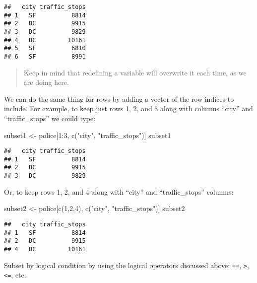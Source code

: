 \documentclass[
]{article}
\newenvironment{Shaded}{\begin{snugshade}}{\end{snugshade}}
\newcommand{\DecValTok}[1]{\textcolor[rgb]{0.00,0.00,0.81}{#1}}
\newcommand{\FunctionTok}[1]{\textcolor[rgb]{0.00,0.00,0.00}{#1}}
\newcommand{\NormalTok}[1]{#1}
\newcommand{\OtherTok}[1]{\textcolor[rgb]{0.56,0.35,0.01}{#1}}
\newcommand{\SpecialCharTok}[1]{\textcolor[rgb]{0.00,0.00,0.00}{#1}}
\newcommand{\StringTok}[1]{\textcolor[rgb]{0.31,0.60,0.02}{#1}}
\begin{document}
\begin{verbatim}
##   city traffic_stops
## 1   SF          8814
## 2   DC          9915
## 3   DC          9829
## 4   DC         10161
## 5   SF          6810
## 6   SF          8991
\end{verbatim}

\begin{quote}
Keep in mind that redefining a variable will overwrite it each time, as
we are doing here.
\end{quote}

We can do the same thing for rows by adding a vector of the row indices
to include. For example, to keep just rows 1, 2, and 3 along with
columns ``city'' and ``traffic\_stops'' we could type:

\begin{Shaded}
\begin{Highlighting}[]
\NormalTok{subset1 }\OtherTok{\textless{}{-}}\NormalTok{ police[}\DecValTok{1}\SpecialCharTok{:}\DecValTok{3}\NormalTok{, }\FunctionTok{c}\NormalTok{(}\StringTok{"city"}\NormalTok{, }\StringTok{"traffic\_stops"}\NormalTok{)]}
\NormalTok{subset1}
\end{Highlighting}
\end{Shaded}

\begin{verbatim}
##   city traffic_stops
## 1   SF          8814
## 2   DC          9915
## 3   DC          9829
\end{verbatim}

Or, to keep rows 1, 2, and 4 along with ``city'' and ``traffic\_stops''
columns:

\begin{Shaded}
\begin{Highlighting}[]
\NormalTok{subset2 }\OtherTok{\textless{}{-}}\NormalTok{ police[}\FunctionTok{c}\NormalTok{(}\DecValTok{1}\NormalTok{,}\DecValTok{2}\NormalTok{,}\DecValTok{4}\NormalTok{), }\FunctionTok{c}\NormalTok{(}\StringTok{"city"}\NormalTok{, }\StringTok{"traffic\_stops"}\NormalTok{)]}
\NormalTok{subset2}
\end{Highlighting}
\end{Shaded}

\begin{verbatim}
##   city traffic_stops
## 1   SF          8814
## 2   DC          9915
## 4   DC         10161
\end{verbatim}

Subset by logical condition by using the logical operators discussed
above: \texttt{==}, \texttt{\textgreater{}}, \texttt{\textless{}=}, etc.
\end{document}
